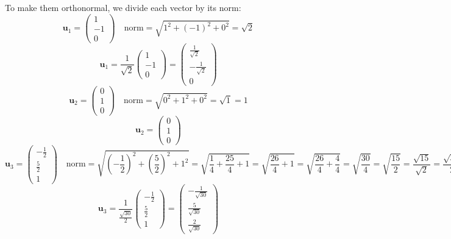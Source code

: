 \documentclass[a3paper,12pt]{extarticle} %
\begin{document}
\begin{enumerate}
\begin{enumerate}
\[        \]
        To make them orthonormal, we divide each vector by its norm:
        \[
            \mathbf{u}_1 = \begin{pmatrix} 1 \\ -1 \\ 0 \end{pmatrix} \quad \text{norm} = \sqrt{1^2 + (-1)^2 + 0^2} = \sqrt{2}
        \]
        \[
            \mathbf{u}_1 = \frac{1}{\sqrt{2}} \begin{pmatrix} 1 \\ -1 \\ 0 \end{pmatrix} = \begin{pmatrix} \frac{1}{\sqrt{2}} \\ -\frac{1}{\sqrt{2}} \\ 0 \end{pmatrix}
        \]
        \[
            \mathbf{u}_2 = \begin{pmatrix} 0 \\ 1 \\ 0 \end{pmatrix} \quad \text{norm} = \sqrt{0^2 + 1^2 + 0^2} = \sqrt{1} = 1
        \]
        \[
            \mathbf{u}_2 = \begin{pmatrix} 0 \\ 1 \\ 0 \end{pmatrix}
        \]
        \[
            \mathbf{u}_3 = \begin{pmatrix} -\frac{1}{2} \\ \frac{5}{2} \\ 1 \end{pmatrix} \quad \text{norm} = \sqrt{\left( -\frac{1}{2} \right)^2 + \left( \frac{5}{2} \right)^2 + 1^2} = \sqrt{\frac{1}{4} + \frac{25}{4} + 1} = \sqrt{\frac{26}{4} + 1} = \sqrt{\frac{26}{4} + \frac{4}{4}} = \sqrt{\frac{30}{4}} = \sqrt{\frac{15}{2}} = \frac{\sqrt{15}}{\sqrt{2}} = \frac{\sqrt{30}}{2}
        \]
        \[
            \mathbf{u}_3 = \frac{1}{\frac{\sqrt{30}}{2}} \begin{pmatrix} -\frac{1}{2} \\ \frac{5}{2} \\ 1 \end{pmatrix} = \begin{pmatrix} -\frac{1}{\sqrt{30}} \\ \frac{5}{\sqrt{30}} \\ \frac{2}{\sqrt{30}} \end{pmatrix}
        \]
        \[
\]
\end{enumerate}
\end{enumerate}
\end{document}
